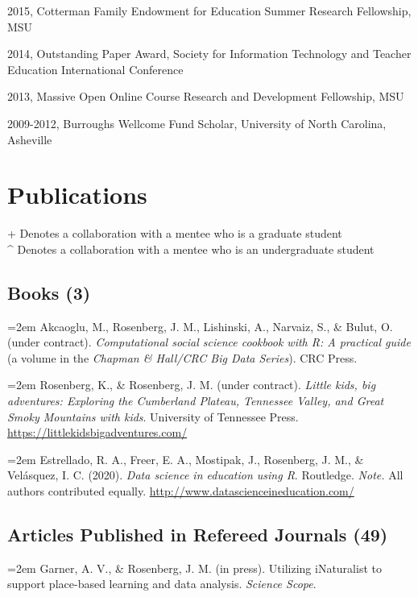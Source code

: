 \documentclass[
  14,
]{article}
\begin{document}
2015, Cotterman Family Endowment for Education Summer Research
Fellowship, MSU

2014, Outstanding Paper Award, Society for Information Technology and
Teacher Education International Conference

2013, Massive Open Online Course Research and Development Fellowship,
MSU

2009-2012, Burroughs Wellcome Fund Scholar, University of North
Carolina, Asheville

\hypertarget{publications}{%
\section{Publications}\label{publications}}

+ Denotes a collaboration with a mentee who is a graduate student\\
\^{} Denotes a collaboration with a mentee who is an undergraduate
student

\hypertarget{books-3}{%
\subsection{Books (3)}\label{books-3}}

\hangindent=2em Akcaoglu, M., Rosenberg, J. M., Lishinski, A., Narvaiz,
S., \& Bulut, O. (under contract). \emph{Computational social science
cookbook with R: A practical guide} (a volume in the \emph{Chapman \&
Hall/CRC Big Data Series}). CRC Press.

\hangindent=2em Rosenberg, K., \& Rosenberg, J. M. (under contract).
\emph{Little kids, big adventures: Exploring the Cumberland Plateau,
Tennessee Valley, and Great Smoky Mountains with kids}. University of
Tennessee Press. \url{https://littlekidsbigadventures.com/}

\hangindent=2em Estrellado, R. A., Freer, E. A., Mostipak, J.,
Rosenberg, J. M., \& Velásquez, I. C. (2020). \emph{Data science in
education using R}. Routledge. \emph{Note.} All authors contributed
equally. \url{http://www.datascienceineducation.com/}

\hypertarget{articles-published-in-refereed-journals-49}{%
\subsection{Articles Published in Refereed Journals
(49)}\label{articles-published-in-refereed-journals-49}}

\hangindent=2em Garner, A. V., \& Rosenberg, J. M. (in press). Utilizing
iNaturalist to support place-based learning and data analysis.
\emph{Science Scope}.
\end{document}
